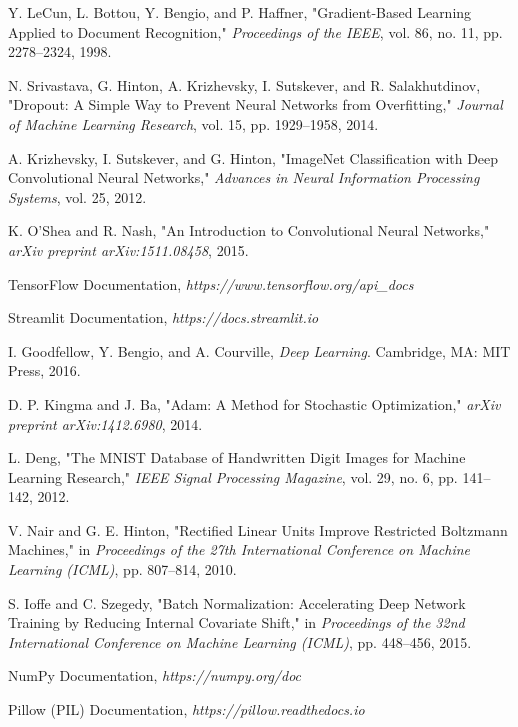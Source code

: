 \documentclass[12pt,a4paper]{report}
\begin{document}
\begin{enumerate}[label={[{\arabic*}]}]
    \item Y. LeCun, L. Bottou, Y. Bengio, and P. Haffner, "Gradient-Based Learning Applied to Document Recognition," \textit{Proceedings of the IEEE}, vol. 86, no. 11, pp. 2278--2324, 1998.
    \item N. Srivastava, G. Hinton, A. Krizhevsky, I. Sutskever, and R. Salakhutdinov, "Dropout: A Simple Way to Prevent Neural Networks from Overfitting," \textit{Journal of Machine Learning Research}, vol. 15, pp. 1929--1958, 2014.
    \item A. Krizhevsky, I. Sutskever, and G. Hinton, "ImageNet Classification with Deep Convolutional Neural Networks," \textit{Advances in Neural Information Processing Systems}, vol. 25, 2012.
    \item K. O'Shea and R. Nash, "An Introduction to Convolutional Neural Networks," \textit{arXiv preprint arXiv:1511.08458}, 2015.
    \item TensorFlow Documentation, \textit{https://www.tensorflow.org/api\_docs}
    \item Streamlit Documentation, \textit{https://docs.streamlit.io}
    \item I. Goodfellow, Y. Bengio, and A. Courville, \textit{Deep Learning}. Cambridge, MA: MIT Press, 2016.
    \item D. P. Kingma and J. Ba, "Adam: A Method for Stochastic Optimization," \textit{arXiv preprint arXiv:1412.6980}, 2014.
    \item L. Deng, "The MNIST Database of Handwritten Digit Images for Machine Learning Research," \textit{IEEE Signal Processing Magazine}, vol. 29, no. 6, pp. 141--142, 2012.
    \item V. Nair and G. E. Hinton, "Rectified Linear Units Improve Restricted Boltzmann Machines," in \textit{Proceedings of the 27th International Conference on Machine Learning (ICML)}, pp. 807--814, 2010.
    \item S. Ioffe and C. Szegedy, "Batch Normalization: Accelerating Deep Network Training by Reducing Internal Covariate Shift," in \textit{Proceedings of the 32nd International Conference on Machine Learning (ICML)}, pp. 448--456, 2015.
    \item NumPy Documentation, \textit{https://numpy.org/doc}
    \item Pillow (PIL) Documentation, \textit{https://pillow.readthedocs.io}
\end{enumerate}
\end{document}
